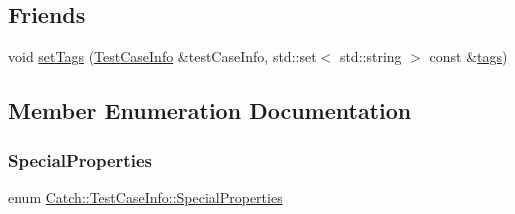 \subsection*{Friends}
\begin{DoxyCompactItemize}
\item 
void \mbox{\hyperlink{struct_catch_1_1_test_case_info_addc10c770e56f49da5baa0c76cf25bd5}{set\+Tags}} (\mbox{\hyperlink{struct_catch_1_1_test_case_info}{Test\+Case\+Info}} \&test\+Case\+Info, std\+::set$<$ std\+::string $>$ const \&\mbox{\hyperlink{struct_catch_1_1_test_case_info_a045f62e7719a8760a5b456f7fd2dc97c}{tags}})
\end{DoxyCompactItemize}


\subsection{Member Enumeration Documentation}
\mbox{\label{struct_catch_1_1_test_case_info_a39b232f74b4a7a6f2183b96759027eac}} 
\subsubsection{\texorpdfstring{Special\+Properties}{SpecialProperties}}
{\footnotesize\ttfamily enum \mbox{\hyperlink{struct_catch_1_1_test_case_info_a39b232f74b4a7a6f2183b96759027eac}{Catch\+::\+Test\+Case\+Info\+::\+Special\+Properties}}}

